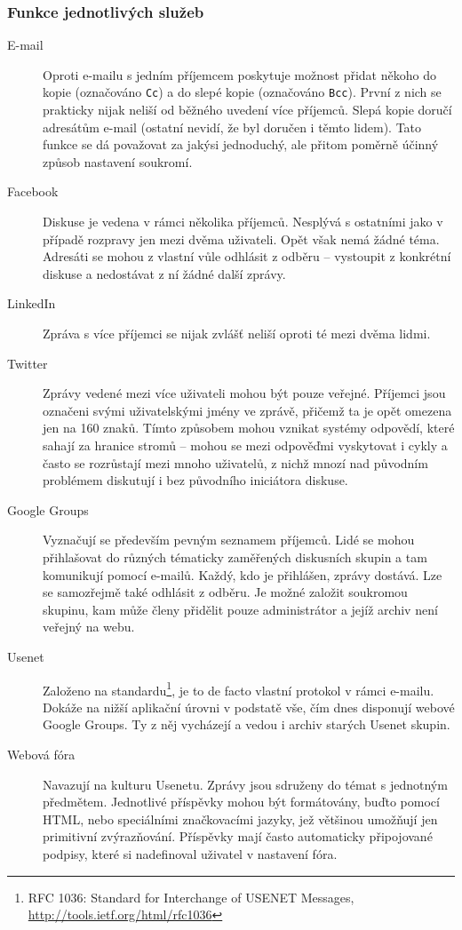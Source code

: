 \documentclass[12pt,oneside,final]{fithesis2}
\begin{document}
\subsubsection*{Funkce jednotlivých služeb}
\begin{description}
    \item[E-mail]
        Oproti e-mailu s jedním příjemcem poskytuje možnost přidat někoho do kopie (označováno {\tt Cc}) a do slepé kopie (označováno {\tt Bcc}). První z nich se prakticky nijak neliší od běžného uvedení více příjemců. Slepá kopie doručí adresátům e-mail  (ostatní nevidí, že byl doručen i těmto lidem). Tato funkce se dá považovat za jakýsi jednoduchý, ale přitom poměrně účinný způsob nastavení soukromí.

    \item[Facebook]
        Diskuse je vedena v rámci několika příjemců. Nesplývá s ostatními jako v případě rozpravy jen mezi dvěma uživateli. Opět však nemá žádné téma. Adresáti se mohou z vlastní vůle odhlásit z odběru -- vystoupit z konkrétní diskuse a nedostávat z ní žádné další zprávy.

    \item[LinkedIn]
        Zpráva s více příjemci se nijak zvlášť neliší oproti té mezi dvěma lidmi.

    \item[Twitter]
        Zprávy vedené mezi více uživateli mohou být pouze veřejné. Příjemci jsou označeni svými uživatelskými jmény ve zprávě, přičemž ta je opět omezena jen na 160 znaků. Tímto způsobem mohou vznikat systémy odpovědí, které sahají za hranice stromů -- mohou se mezi odpověďmi vyskytovat i cykly a často se rozrůstají mezi mnoho uživatelů, z nichž mnozí nad původním problémem diskutují i bez původního iniciátora diskuse.

    \item[Google Groups]
        Vyznačují se především pevným seznamem příjemců. Lidé se mohou přihlašovat do různých tématicky zaměřených diskusních skupin a tam komunikují pomocí e-mailů. Každý, kdo je přihlášen, zprávy dostává. Lze se samozřejmě také odhlásit z odběru. Je možné založit soukromou skupinu, kam může členy přidělit pouze administrátor a jejíž archiv není veřejný na webu.

    \item[Usenet]
        Založeno na standardu\footnote{RFC 1036: Standard for Interchange of USENET Messages, \url{http://tools.ietf.org/html/rfc1036}}, je to de facto vlastní protokol v rámci e-mailu. Dokáže na nižší aplikační úrovni v podstatě vše, čím dnes disponují webové Google Groups. Ty z něj vycházejí a vedou i archiv starých Usenet skupin.

    \item[Webová fóra]
        Navazují na kulturu Usenetu. Zprávy jsou sdruženy do témat s jednotným předmětem. Jednotlivé příspěvky mohou být formátovány, buďto pomocí HTML, nebo speciálními značkovacími jazyky, jež většinou umožňují jen primitivní zvýrazňování. Příspěvky mají často automaticky připojované podpisy, které si nadefinoval uživatel v nastavení fóra.
\end{description}
\end{document}
